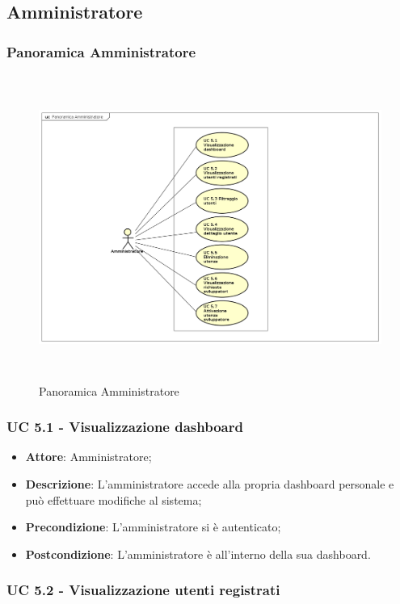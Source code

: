 \subsection{Amministratore}

\subsubsection{Panoramica Amministratore}
\begin{figure}[H]
\centering
\includegraphics[width=17cm, height=10cm]{img/PanoramicaAmministratore.png} 
\caption{Panoramica Amministratore}
\end{figure}


\subsubsection{UC 5.1 - Visualizzazione dashboard}

\begin{itemize}
\item \textbf{Attore}: Amministratore; 
\item \textbf{Descrizione}: L'amministratore accede alla propria dashboard personale e può effettuare modifiche al sistema;
\item \textbf{Precondizione}: L'amministratore si è autenticato;
\item \textbf{Postcondizione}: L'amministratore è all'interno della sua dashboard.
\end{itemize}

\subsubsection{UC 5.2 - Visualizzazione utenti registrati}

